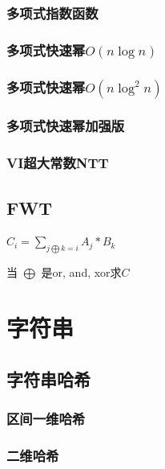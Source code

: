 \documentclass[twoside,a4paper]{article}
\begin{document}
\subsubsection{多项式指数函数}

\subsubsection{多项式快速幂$O(n \log n)$}

\subsubsection{多项式快速幂$O(n \log ^{2} n)$}

\subsubsection{多项式快速幂加强版}

\subsubsection{VI超大常数NTT}


\subsection{FWT}
$C_{i} = \sum_{j \bigoplus k = i} A_{j} * B_{k}$ \par
当 $\bigoplus$ 是or, and, xor求$C$



\section{字符串}

\subsection{字符串哈希}
\subsubsection{区间一维哈希}

\subsubsection{二维哈希}

\end{document}
